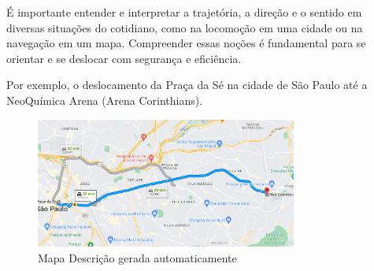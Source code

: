 \begin{escolha}
\begin{boxmedio}
\begin{boxmedio}
{\begin{boxpeq}
\begin{boxpeq}
{\begin{boxpeq}
\begin{boxmedio}
\begin{boxmedio}
\begin{boxpeq}
\begin{boxmedio}
\begin{boxpeq}
\begin{boxpeq}
\begin{boxpeq}
\begin{boxpeq}
\begin{boxmedio}
{\begin{boxmedio}
\begin{boxmedio}
\begin{boxpeq}
\begin{boxmedio}
\begin{boxpeq}
\begin{boxpeq}
\begin{boxpeq}
\begin{escolha}
{\begin{boxmedio}
\begin{boxpeq}
\begin{boxpeq}
\begin{boxpeq}
\begin{boxpeq}
\begin{boxpeq}
\begin{boxmedio}
\begin{boxpeq}
\begin{boxpeq}
\begin{boxpeq}
{\begin{boxpeq}
\begin{boxmedio}
\begin{boxpeq}
\begin{boxpeq}
\begin{boxpeq}
{\begin{boxpeq}
\begin{boxmedio}
{\begin{boxpeq}
\begin{boxpeq}
\begin{boxmedio}
\begin{boxmedio}
\begin{boxpeq}
\begin{boxpeq}
{\begin{boxpeq}
\begin{boxpeq}
\begin{boxpeq}
\begin{boxpeq}
\begin{boxpeq}
\begin{escolha}
\begin{escolha}
{\begin{boxmedio}
\begin{boxpeq}
\begin{q°}
\begin{boxmedio}
\begin{boxpeq}
\begin{boxpeq}
\begin{boxmedio}
\begin{boxmedio}
\begin{boxmedio}
{É importante entender e interpretar a trajetória, a direção e o sentido
em diversas situações do cotidiano, como na locomoção em uma cidade ou
na navegação em um mapa. Compreender essas noções é fundamental para se
orientar e se deslocar com segurança e eficiência.

Por exemplo, o deslocamento da Praça da Sé na cidade de São Paulo até a
NeoQuímica Arena (Arena Corinthians).

\begin{figure}
\centering
\includegraphics[width=3.39062in,height=1.68534in]{./_SAEB_9_MAT/media/image196.png}
\caption{Mapa Descrição gerada automaticamente}
\end{figure}


}


\end{boxmedio}
\end{boxmedio}
\end{boxmedio}
\end{boxpeq}
\end{boxpeq}
\end{boxmedio}
\end{q°}
\end{boxpeq}
\end{boxmedio}}
\end{escolha}
\end{escolha}
\end{boxpeq}
\end{boxpeq}
\end{boxpeq}
\end{boxpeq}
\end{boxpeq}}
\end{boxpeq}
\end{boxpeq}
\end{boxmedio}
\end{boxmedio}
\end{boxpeq}
\end{boxpeq}}
\end{boxmedio}
\end{boxpeq}}
\end{boxpeq}
\end{boxpeq}
\end{boxpeq}
\end{boxmedio}
\end{boxpeq}}
\end{boxpeq}
\end{boxpeq}
\end{boxpeq}
\end{boxmedio}
\end{boxpeq}
\end{boxpeq}
\end{boxpeq}
\end{boxpeq}
\end{boxpeq}
\end{boxmedio}}
\end{escolha}
\end{boxpeq}
\end{boxpeq}
\end{boxpeq}
\end{boxmedio}
\end{boxpeq}
\end{boxmedio}
\end{boxmedio}}
\end{boxmedio}
\end{boxpeq}
\end{boxpeq}
\end{boxpeq}
\end{boxpeq}
\end{boxmedio}
\end{boxpeq}
\end{boxmedio}
\end{boxmedio}
\end{boxpeq}}
\end{boxpeq}
\end{boxpeq}}
\end{boxmedio}
\end{boxmedio}
\end{escolha}
